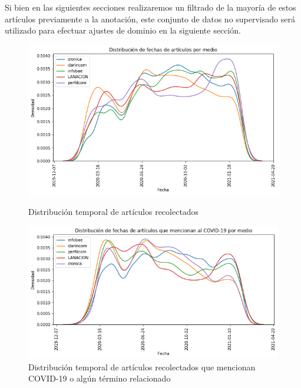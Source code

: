 Si bien en las siguientes secciones realizaremos un filtrado de la mayoría de estos artículos previamente a la anotación, este conjunto de datos no supervisado será utilizado para efectuar ajustes de dominio en la siguiente sección.

\begin{figure}
    \centering
    \includegraphics[width=\textwidth]{img/fechas_por_medios_todas.png}
    \caption{Distribución temporal de artículos recolectados}
    \label{fig:fecha_articulos_por_medio_todas}
    \includegraphics[width=\textwidth]{img/fechas_por_medios.png}
    \caption{Distribución temporal de artículos recolectados que mencionan COVID-19 o algún término relacionado}
    \label{fig:fecha_articulos_por_medio_covid}
\end{figure}

